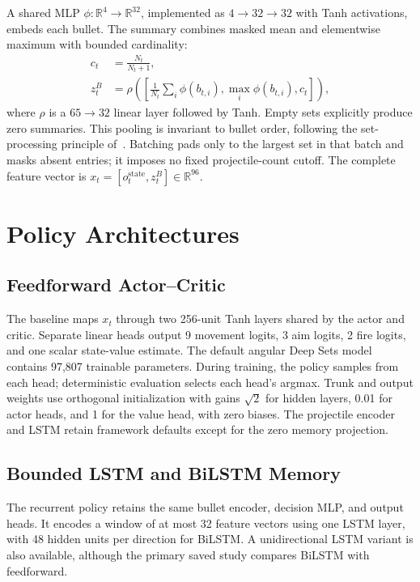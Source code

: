 \documentclass[conference]{IEEEtran}
\newcommand{\R}{\mathbb{R}}
\begin{document}
A shared MLP $\phi:\R^4\!\to\R^{32}$, implemented as $4\to32\to32$ with Tanh activations, embeds each bullet. The summary combines masked mean and elementwise maximum with bounded cardinality:
\begin{align}
c_t &= \frac{N_t}{N_t+1},\\
z_t^B &= \rho\!\left(\left[\frac{1}{N_t}\sum_i\phi(b_{t,i}),
\max_i\phi(b_{t,i}),c_t\right]\right),
\end{align}
where $\rho$ is a $65\to32$ linear layer followed by Tanh. Empty sets explicitly produce zero summaries. This pooling is invariant to bullet order, following the set-processing principle of~\cite{deepsets}. Batching pads only to the largest set in that batch and masks absent entries; it imposes no fixed projectile-count cutoff. The complete feature vector is $x_t=[o_t^{\mathrm{state}},z_t^B]\in\R^{96}$.

\section{Policy Architectures}
\subsection{Feedforward Actor--Critic}
The baseline maps $x_t$ through two 256-unit Tanh layers shared by the actor and critic. Separate linear heads output 9 movement logits, 3 aim logits, 2 fire logits, and one scalar state-value estimate. The default angular Deep Sets model contains 97,807 trainable parameters. During training, the policy samples from each head; deterministic evaluation selects each head's argmax. Trunk and output weights use orthogonal initialization with gains $\sqrt{2}$ for hidden layers, 0.01 for actor heads, and 1 for the value head, with zero biases. The projectile encoder and LSTM retain framework defaults except for the zero memory projection.

\subsection{Bounded LSTM and BiLSTM Memory}
The recurrent policy retains the same bullet encoder, decision MLP, and output heads. It encodes a window of at most 32 feature vectors using one LSTM layer, with 48 hidden units per direction for BiLSTM. A unidirectional LSTM variant is also available, although the primary saved study compares BiLSTM with feedforward.
\end{document}
